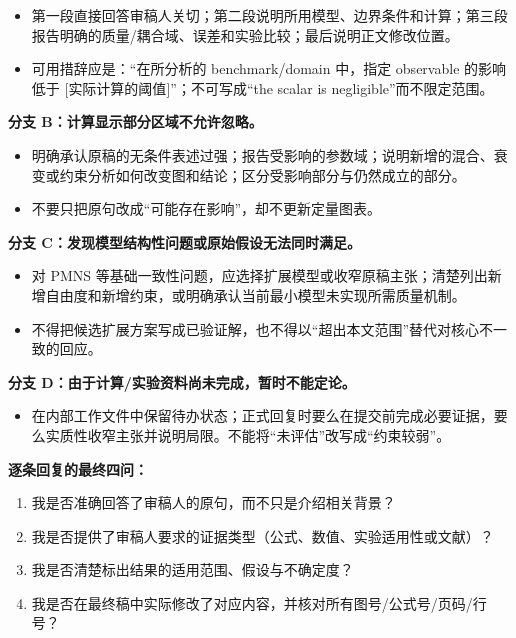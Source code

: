 \documentclass[
]{article}
\providecommand{\tightlist}{%
  \setlength{\itemsep}{0pt}\setlength{\parskip}{0pt}}
\begin{document}
\begin{itemize}
\tightlist
\item
  第一段直接回答审稿人关切；第二段说明所用模型、边界条件和计算；第三段报告明确的质量/耦合域、误差和实验比较；最后说明正文修改位置。
\item
  可用措辞应是：``在所分析的 benchmark/domain 中，指定 observable
  的影响低于 {[}实际计算的阈值{]}''；不可写成``the scalar is
  negligible''而不限定范围。
\end{itemize}

\textbf{分支 B：计算显示部分区域不允许忽略。}

\begin{itemize}
\tightlist
\item
  明确承认原稿的无条件表述过强；报告受影响的参数域；说明新增的混合、衰变或约束分析如何改变图和结论；区分受影响部分与仍然成立的部分。
\item
  不要只把原句改成``可能存在影响''，却不更新定量图表。
\end{itemize}

\textbf{分支 C：发现模型结构性问题或原始假设无法同时满足。}

\begin{itemize}
\tightlist
\item
  对 PMNS
  等基础一致性问题，应选择扩展模型或收窄原稿主张；清楚列出新增自由度和新增约束，或明确承认当前最小模型未实现所需质量机制。
\item
  不得把候选扩展方案写成已验证解，也不得以``超出本文范围''替代对核心不一致的回应。
\end{itemize}

\textbf{分支 D：由于计算/实验资料尚未完成，暂时不能定论。}

\begin{itemize}
\tightlist
\item
  在内部工作文件中保留待办状态；正式回复时要么在提交前完成必要证据，要么实质性收窄主张并说明局限。不能将``未评估''改写成``约束较弱''。
\end{itemize}

\textbf{逐条回复的最终四问：}

\begin{enumerate}
\def\labelenumi{\arabic{enumi}.}
\tightlist
\item
  我是否准确回答了审稿人的原句，而不只是介绍相关背景？
\item
  我是否提供了审稿人要求的证据类型（公式、数值、实验适用性或文献）？
\item
  我是否清楚标出结果的适用范围、假设与不确定度？
\item
  我是否在最终稿中实际修改了对应内容，并核对所有图号/公式号/页码/行号？
\end{enumerate}
\end{document}
